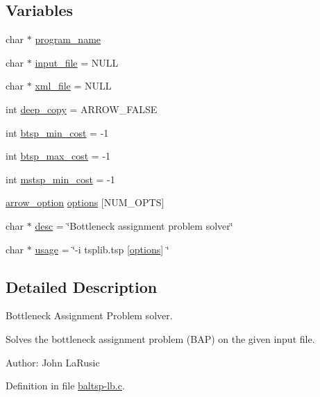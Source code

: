 \subsection*{Variables}
\begin{CompactItemize}
\item 
char $\ast$ \hyperlink{bin_2baltsp-lb_8c_289c5900d90626d909f0a85d5a0ed61d}{program\_\-name}
\item 
char $\ast$ \hyperlink{bin_2baltsp-lb_8c_a4f3a15de34c409bdec6ceacf93078ed}{input\_\-file} = NULL
\item 
char $\ast$ \hyperlink{bin_2baltsp-lb_8c_bf4e392494984c6ef8259268eb1fe421}{xml\_\-file} = NULL
\item 
int \hyperlink{bin_2baltsp-lb_8c_7298da576a5b127d04b4c46b3bc78821}{deep\_\-copy} = ARROW\_\-FALSE
\item 
int \hyperlink{bin_2baltsp-lb_8c_97987334c96a847ff74c2c6c83d78a73}{btsp\_\-min\_\-cost} = -1
\item 
int \hyperlink{bin_2baltsp-lb_8c_8135b6557d64f65441d8f07fdc21ffdc}{btsp\_\-max\_\-cost} = -1
\item 
int \hyperlink{bin_2baltsp-lb_8c_79e1b33b7d744b8baacfe9c0b2e73013}{mstsp\_\-min\_\-cost} = -1
\item 
\hyperlink{structarrow__option}{arrow\_\-option} \hyperlink{bin_2baltsp-lb_8c_cea6a9709d519c143f30db401a0d0c72}{options} \mbox{[}NUM\_\-OPTS\mbox{]}
\item 
char $\ast$ \hyperlink{bin_2baltsp-lb_8c_3aad16fd4bea1b9717f232ea75ad6449}{desc} = \char`\"{}Bottleneck assignment problem solver\char`\"{}
\item 
char $\ast$ \hyperlink{bin_2baltsp-lb_8c_adebe2487a2c5240ab6cd02c83add0bf}{usage} = \char`\"{}-i tsplib.tsp \mbox{[}\hyperlink{tourinfo_8c_cea6a9709d519c143f30db401a0d0c72}{options}\mbox{]} \char`\"{}
\end{CompactItemize}


\subsection{Detailed Description}
Bottleneck Assignment Problem solver. 

Solves the bottleneck assignment problem (BAP) on the given input file.

\begin{Desc}
\item[Author:]John LaRusic \end{Desc}


Definition in file \hyperlink{bin_2baltsp-lb_8c-source}{baltsp-lb.c}.


